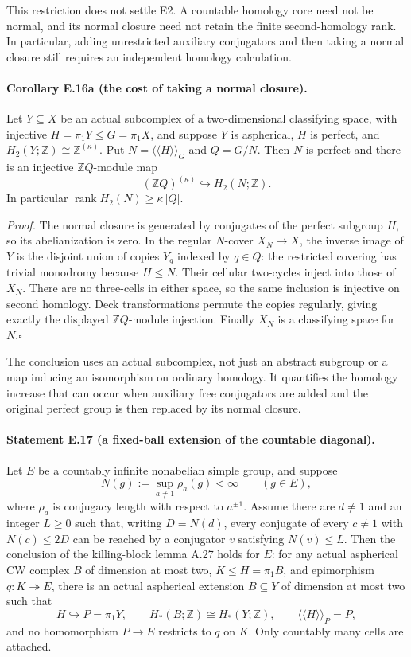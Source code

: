 This restriction does not settle E2. A countable homology
core need not be normal, and its normal closure need not
retain the finite second-homology rank. In particular, adding
unrestricted auxiliary conjugators and then taking a normal
closure still requires an independent homology calculation.


\paragraph{Corollary E.16a (the cost of taking a normal closure).}
Let $Y\subseteq X$ be an actual subcomplex of a two-dimensional
classifying space, with injective $H=\pi_1Y\leq G=\pi_1X$,
and suppose $Y$ is aspherical, $H$ is perfect, and
$H_2(Y;\mathbb Z)\cong\mathbb Z^{(\kappa)}$.
Put $N=\langle\!\langle H\rangle\!\rangle_G$ and $Q=G/N$.
Then $N$ is perfect and there is an injective $\mathbb ZQ$-module map
\[
                   (\mathbb ZQ)^{(\kappa)}\hookrightarrow H_2(N;\mathbb Z).
\]
In particular $\operatorname{rank}H_2(N)\geq\kappa\,|Q|$.

\emph{Proof.}
The normal closure is generated by conjugates of the perfect
subgroup $H$, so its abelianization is zero. In the regular
$N$-cover $X_N\to X$, the inverse image of $Y$ is the disjoint
union of copies $Y_q$ indexed by $q\in Q$: the restricted
covering has trivial monodromy because $H\leq N$. Their cellular
two-cycles inject into those of $X_N$. There are no three-cells
in either space, so the same inclusion is injective on second
homology. Deck transformations permute the copies regularly,
giving exactly the displayed $\mathbb ZQ$-module injection.
Finally $X_N$ is a classifying space for $N$.\hfill$\square$

The conclusion uses an actual subcomplex, not just an abstract
subgroup or a map inducing an isomorphism on ordinary homology.
It quantifies the homology increase that can occur when auxiliary
free conjugators are added and the original perfect group is
then replaced by its normal closure.

\paragraph{Statement E.17 (a fixed-ball extension of the countable diagonal).}
Let $E$ be a countably infinite nonabelian simple group, and suppose
\[
 N(g):=\sup_{a\ne1}\rho_a(g)<\infty\qquad(g\in E),
\]
where $\rho_a$ is conjugacy length with respect to $a^{\pm1}$.
Assume there are $d\ne1$ and an integer $L\geq0$ such that, writing
$D=N(d)$, every conjugate of every $c\ne1$ with $N(c)\leq2D$
can be reached by a conjugator $v$ satisfying $N(v)\leq L$.
Then the conclusion of the killing-block lemma A.27 holds for $E$:
for any actual aspherical CW complex $B$ of dimension at most two,
$K\leq H=\pi_1B$, and epimorphism $q:K\twoheadrightarrow E$, there
is an actual aspherical extension $B\subseteq Y$ of dimension at
most two such that
\[
 H\hookrightarrow P=\pi_1Y,\qquad
 H_*(B;\mathbb Z)\cong H_*(Y;\mathbb Z),\qquad
 \langle\!\langle H\rangle\!\rangle_P=P,
\]
and no homomorphism $P\to E$ restricts to $q$ on $K$.
Only countably many cells are attached.


